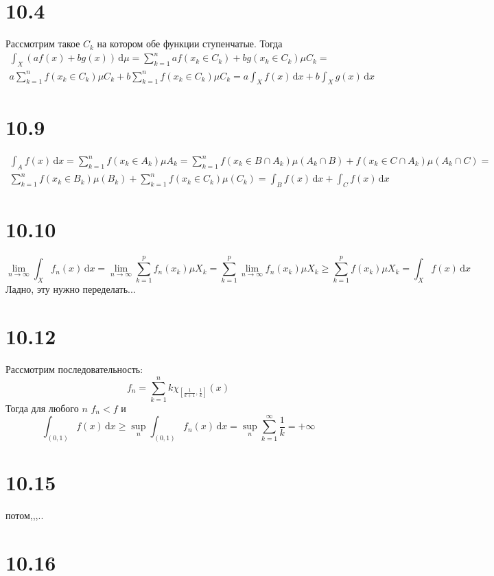 \documentclass[12pt]{article}
\begin{document}
\section{10.4}
Рассмотрим такое $C_k$ на котором обе функции ступенчатые. Тогда 
\[
    \begin{split}
    \int_X (af(x) + bg(x)) \,\mathrm{d}\mu = \sum_{k=1}^{n} af(x_k \in C_k) + bg(x_k \in C_k) \mu C_k = \\
    a\sum_{k=1}^{n} f(x_k \in C_k) \mu C_k + b\sum_{k=1}^{n} f(x_k \in C_k) \mu C_k = 
    a\int_X f(x) \,\mathrm{d}x + b\int_{X} g(x) \,\mathrm{d}x  
    \end{split}
\] 
\section{10.9}
\[
    \begin{split}
        \int_A f(x) \,\mathrm{d}x = \sum_{k=1}^{n} f(x_k \in A_k) \mu A_k = 
    \sum_{k=1}^{n} f(x_k \in B \cap A_k) \mu (A_k \cap B) + f(x_k \in C \cap A_k) \mu (A_k \cap C) = \\
    \sum_{k=1}^{n} f(x_k \in B_k) \mu (B_k) + \sum_{k=1}^{n} f(x_k \in C_k) \mu (C_k) = 
    \int_{B} f(x) \,\mathrm{d}x + \int_{C} f(x) \,\mathrm{d}x  
    \end{split}
\]
\section{10.10}
\[
    \lim_{n \to \infty} \int_X f_n(x) \,\mathrm{d}x = 
    \lim_{n \to \infty} \sum_{k=1}^{p} f_n(x_k) \mu X_k = 
    \sum_{k=1}^{p} \lim_{n \to \infty} f_n(x_k) \mu X_k \geq 
    \sum_{k=1}^{p} f(x_k) \mu X_k = \int_{X} f(x) \,\mathrm{d}x 
\]
Ладно, эту нужно переделать...
\section{10.12}
Рассмотрим последовательность: 
\[
    f_n = \sum_{k=1}^{n} k \chi_{[\frac{1}{k+1}, \frac{1}{k}]}(x) 
\]
Тогда для любого $n$ $f_n < f$ и 
\[
    \int_{(0, 1)} f(x) \,\mathrm{d}x \geq \sup_{n} \int_{(0, 1)} f_n(x) \,\mathrm{d}x = 
    \sup_n \sum_{k=1}^{\infty} \frac{1}{k} = +\infty  
\]  
\section{10.15}
потом,,,.. 
\section{10.16}
\end{document}

